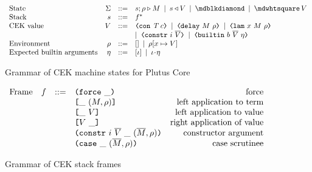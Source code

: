 \begin{figure}[H]
    \centering
    \[\begin{array}{lrclr}
    \textrm{State} & \Sigma & ::= & s;\rho \compute M \enspace | \enspace s \return V  \enspace |
       \enspace \cekerror{} \enspace | \enspace \cekhalt{V}\\
    \textrm{Stack} & s      & ::= & f^*\\
    \textrm{CEK value} & V &  ::= & \VCon{\tn}{c} \enspace | \enspace \VDelay{M}{\rho}
       \enspace| \enspace \VLamAbs{x}{M}{\rho} \enspace \\
       &&& | \enspace \VConstr{i}{\repetition{V}} \enspace | \enspace \VBuiltin{b}{\repetition{V}}{\eta}\\
    \textrm{Environment} & \rho & ::= & [] \enspace | \enspace \rho[x \mapsto V] \\
    \textrm{Expected builtin arguments} & \eta & ::= & [\iota] \enspace | \enspace \iota \cons \eta\\
    \end{array}\]
    \caption{Grammar of CEK machine states for Plutus Core}
    \label{fig:untyped-cek-states}
\end{figure}%
%
%
%
%
%

\begin{figure}[H]
    \centering
    \[\begin{array}{lrclr}
        \textrm{Frame} & f  & ::=   & \texttt{(} \texttt{force} ~ \_ \texttt{)}                                                       & \textrm{force}\\
                       &    &       & \texttt{[} \_ ~ (M,\rho) \texttt{]}                                           & \textrm{left application to term}\\
                       &    &       & \texttt{[} \_ ~ V \texttt{]}                                                  & \textrm{left application to value}\\
                       &    &       & \texttt{[} V ~ \_ \texttt{]}                                                 & \textrm{right application of value}\\
                       &    &       & \texttt{(} \texttt{constr} ~ i ~ \overline{V} ~ \_ ~ (\overline{M}, \rho) \texttt{)}           & \textrm{constructor argument}\\
                       &    &       & \texttt{(} \texttt{case} ~ \_ ~ (\overline{M}, \rho) \texttt{)}                                & \textrm{case scrutinee}

    \end{array}\]
    \caption{Grammar of CEK stack frames}
    \label{fig:untyped-cek-reduction-frames}
\end{figure}%

